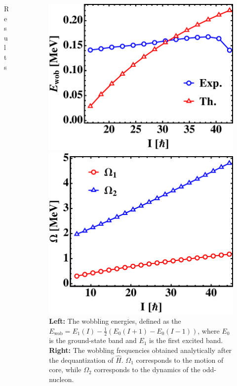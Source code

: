 \documentclass[final]{beamer}
\newlength{\sepwidth}
\newlength{\colwidth}
\newcommand{\separatorcolumn}{\begin{column}{\sepwidth}\end{column}}
\begin{document}
\begin{frame}[t]
\begin{columns}[t]
\begin{column}{\colwidth}
\begin{block}{Results}
  \end{block}
\end{column}
\separatorcolumn
\begin{column}{\colwidth}
  \begin{figure}
\centering
\begin{minipage}{.5\textwidth}
  \centering
  \includegraphics[scale=1.27]{images/wobbEnergies.pdf}
\end{minipage}%
\begin{minipage}{.5\textwidth}
  \centering
 \includegraphics[scale=1.2]{images/wobbFrequencies.pdf}
\end{minipage}
\caption{\textbf{Left:} The wobbling energies, defined as the $E_\text{wob}=E_1(I)-\frac{1}{2}(E_0(I+1)-E_0(I-1))$, where $E_0$ is the ground-state band and $E_1$ is the first excited band. \textbf{Right:} The wobbling frequencies obtained analytically after the dequantization of $\hat{H}$. $\Omega_1$ corresponds to the motion of core, while $\Omega_2$ corresponds to the dynamics of the odd-nucleon.}
    \label{wobb-energies}
\end{figure}


\end{column}
\end{columns}
\end{frame}
\end{document}
